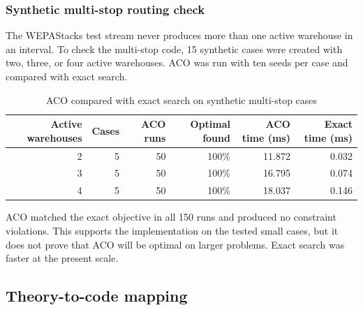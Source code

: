 \documentclass[10pt]{article}
\begin{document}
\subsubsection{Synthetic multi-stop routing check}

The WEPAStacks test stream never produces more than one active warehouse in an interval. To check the multi-stop code, 15 synthetic cases were created with two, three, or four active warehouses. ACO was run with ten seeds per case and compared with exact search.

\begin{table}[H]
\centering
\caption{ACO compared with exact search on synthetic multi-stop cases}
\label{tab:aco-exact-benchmark}
\small
\begin{tabular}{rrrrrr}
\toprule
Active warehouses & Cases & ACO runs & Optimal found & ACO time (ms) & Exact time (ms) \\
\midrule
2 & 5 & 50 & 100\% & 11.872 & 0.032 \\
3 & 5 & 50 & 100\% & 16.795 & 0.074 \\
4 & 5 & 50 & 100\% & 18.037 & 0.146 \\
\bottomrule
\end{tabular}
\end{table}

ACO matched the exact objective in all 150 runs and produced no constraint violations. This supports the implementation on the tested small cases, but it does not prove that ACO will be optimal on larger problems. Exact search was faster at the present scale.

\subsection{Theory-to-code mapping}
\end{document}
